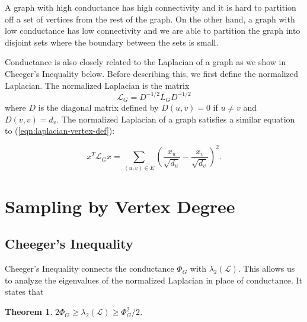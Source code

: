 \documentclass[12pt,twoside]{article}
\newtheorem{thm}{Theorem}
\begin{document}
A graph with high conductance has high connectivity and it is hard to partition off a set of vertices from the rest of the graph. On the other hand, a graph with low conductance has low connectivity and we are able to partition the graph into disjoint sets where the boundary between the sets is small. 

Conductance is also closely related to the Laplacian of a graph as we show in Cheeger's Inequality below. Before describing this, we first define the normalized Laplacian. The normalized Laplacian is the matrix
%
\begin{equation}
\label{def:normalized-laplacian}
\mathcal{L}_G = D^{-1/2}L_GD^{-1/2}
\end{equation}
%
where $D$ is the diagonal matrix defined by $D(u,v) = 0$ if $u \neq v$ and $D(v,v) = d_v$. The normalized Laplacian of a graph satisfies a similar equation to (\ref{eqn:laplacian-vertex-def}):

\begin{equation}
\label{eqn:norm-laplac}
x^T \mathcal{L}_G x = \sum_{(u,v) \in E} \left(\frac{x_u}{\sqrt{d_u}}-\frac{x_v}{\sqrt{d_v}}\right)^2.
\end{equation}

\section{Sampling by Vertex Degree}

\subsection{Cheeger's Inequality} %
Cheeger's Inequality connects the conductance $\Phi_G$ with $\lambda_2(\mathcal{L})$. This allows us to analyze the eigenvalues of the normalized Laplacian in place of conductance. It states that

\begin{thm}
$2\Phi_G \geq \lambda_2(\mathcal{L}) \geq \Phi_G^2/2$.
\end{thm}
\end{document}
